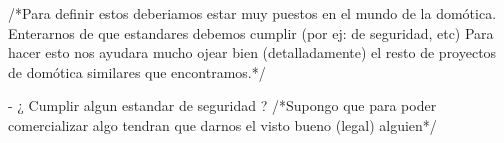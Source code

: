 /*Para definir estos deberiamos estar muy puestos en el mundo de la domótica. Enterarnos de que estandares debemos cumplir (por ej: de seguridad, etc)\newline
Para hacer esto nos ayudara mucho ojear bien (detalladamente) el resto de proyectos de domótica similares que encontramos.*/\newline

- ¿ Cumplir algun estandar de seguridad ?\newline
/*Supongo que para poder comercializar algo tendran que darnos el visto bueno (legal) alguien*/\newline